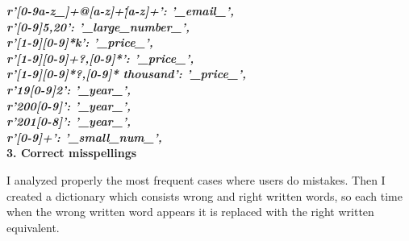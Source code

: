 \noindent
\textit{\textbf{r'[0-9a-z\_]+@[a-z]+\.[a-z]+': '\_email\_', \\
r'[0-9]{5,20}': '\_large\_number\_',\\
r'[1-9][0-9]*k': '\_price\_',
\\
r'[1-9][0-9]+?,[0-9]*': '\_price\_',
\\
r'[1-9][0-9]*?,[0-9]* thousand': '\_price\_',
\\
r'19[0-9]{2}': '\_year\_',
\\
r'200[0-9]': '\_year\_',
\\
r'201[0-8]': '\_year\_',
\\
r'[0-9]+': '\_small\_num\_',}}
\\

\noindent \textbf{3. Correct misspellings}

I analyzed properly the most frequent cases where users do mistakes. Then I created a dictionary which consists wrong and right written words, so each time when the wrong written word appears it is replaced with the right written equivalent. 

\newcolumntype{b}{X}

